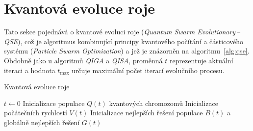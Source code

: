 \section{Kvantová evoluce roje}\label{sec:qse}
Tato sekce pojednává o kvantové evoluci roje (\emph{Quantum Swarm Evolutionary\,--\,QSE}), což je algoritmus kombinující principy kvantového počítání a částicového systému (\emph{Particle Swarm Optimization}) a jež je znázorněn na algoritmu~\ref{alg:qse}. 
Obdobně jako u algoritmů \emph{QIGA} a \emph{QISA}, proměnná $t$ reprezentuje aktuální iteraci a hodnota $t_{\text{max}}$ určuje maximální počet iterací evolučního procesu.

\begin{algorithm}[ht]
    \caption{Kvantová evoluce roje~\cite{qse}}
    \label{alg:qse}
    $t \gets 0$\;
    Inicializace populace $Q\left(t\right)$ kvantových chromozomů\;
    Inicializace počátečních rychlostí $V\left(t\right)$\;
    Inicializace nejlepších řešení populace $B\left(t\right)$ a globálně nejlepších řešení $G\left(t\right)$\;
\end{algorithm}

